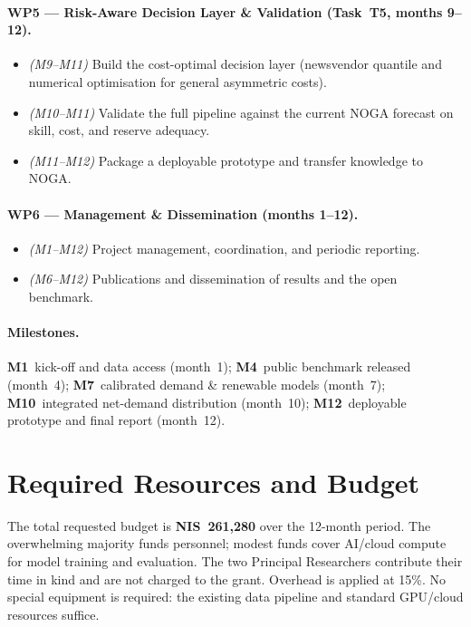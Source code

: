 \documentclass[12pt,a4paper]{article}
\begin{document}
\paragraph{WP5 --- Risk-Aware Decision Layer \& Validation (Task~T5, months 9--12).}
\begin{itemize}[leftmargin=2.6em,labelsep=0.6em]
    \item[\textbf{T5.1}] \emph{(M9--M11)} Build the cost-optimal decision layer (newsvendor
          quantile and numerical optimisation for general asymmetric costs).
    \item[\textbf{T5.2}] \emph{(M10--M11)} Validate the full pipeline against the current NOGA
          forecast on skill, cost, and reserve adequacy.
    \item[\textbf{T5.3}] \emph{(M11--M12)} Package a deployable prototype and transfer
          knowledge to NOGA.
\end{itemize}

\paragraph{WP6 --- Management \& Dissemination (months 1--12).}
\begin{itemize}[leftmargin=2.6em,labelsep=0.6em]
    \item[\textbf{6.1}] \emph{(M1--M12)} Project management, coordination, and periodic
          reporting.
    \item[\textbf{6.2}] \emph{(M6--M12)} Publications and dissemination of results and the
          open benchmark.
\end{itemize}

\paragraph{Milestones.} \textbf{M1}~kick-off and data access (month~1); \textbf{M4}~public
benchmark released (month~4); \textbf{M7}~calibrated demand \& renewable models (month~7);
\textbf{M10}~integrated net-demand distribution (month~10); \textbf{M12}~deployable prototype
and final report (month~12).

\section{Required Resources and Budget}
\label{sec:budget}

The total requested budget is \textbf{NIS~261{,}280} over the 12-month period. The
overwhelming majority funds personnel; modest funds cover AI/cloud compute for model
training and evaluation. The two Principal Researchers contribute their time in kind and
are not charged to the grant. Overhead is applied at 15\%. No special equipment is
required: the existing data pipeline and standard GPU/cloud resources suffice.
\end{document}
